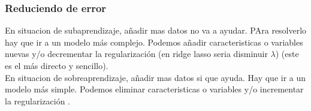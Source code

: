 \subsubsection{Reduciendo de error}

En situacion de subaprendizaje, añadir mas datos no va a ayudar. PAra resolverlo hay que ir a un modelo más complejo. Podemos añadir caracteristicas o variables nuevas y/o decrementar la regularización (en ridge lasso seria disminuir $\lambda$) (este es el más directo y sencillo). \\

En situacion de sobreaprendizaje, añadir mas datos si que ayuda. Hay que ir a un modelo más simple. Podemos eliminar caracteristicas o variables y/o incrementar la regularización .